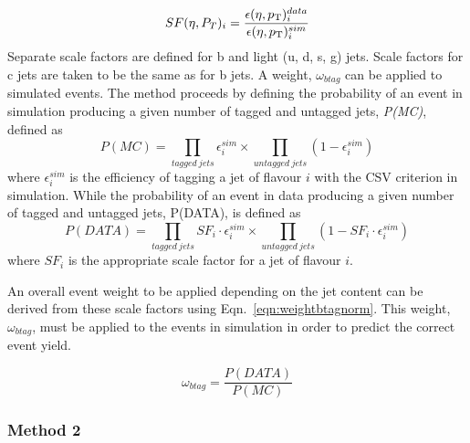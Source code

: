 \begin{equation}
SF(\eta, P_{T})_{i} = \frac{\epsilon(\eta , p_{\mathrm{T}})^{data}_{i}}{\epsilon(\eta , p_{\mathrm{T}})^{sim}_{i}}
\label{eqn:sfbtagnorm}
\end{equation}
Separate scale factors are defined for b and light (u, d, s, g) jets. Scale factors for c jets are taken to be the same as for b jets. A weight, $\omega_{btag}$ can be applied to simulated events. The method proceeds by defining the probability of an event in simulation producing a given number of tagged and untagged jets, \emph{P(MC)}, defined as%
\begin{equation*}
P(MC) = \prod_{tagged~jets}\epsilon^{sim}_{i} \times \prod_{untagged~jets}(1- \epsilon^{sim}_{i})
\end{equation*}
where $\epsilon^{sim}_{i}$ is the efficiency of tagging a jet of flavour $i$ with the CSV criterion in simulation. While the probability of an event in data producing a given number of tagged and untagged jets, P(DATA), is defined as
\begin{equation*}
P(DATA) = \prod_{tagged~jets}SF_{i}\cdot\epsilon^{sim}_{i} \times \prod_{untagged~jets}(1- SF_{i}\cdot\epsilon^{sim}_{i})
\end{equation*}
where $SF_{i}$ is the appropriate scale factor for a jet of flavour $i$. 

An overall event weight to be applied depending on the jet content can be derived from these scale factors using Eqn.~\ref{eqn:weightbtagnorm}. This weight, $\omega_{btag}$, must be applied to the events in simulation in order to predict the correct event yield.

\begin{centering}
\begin{equation}
 \omega_{btag} = \frac{P(DATA)}{P(MC)}
 \label{eqn:weightbtagnorm}
\end{equation}
\end{centering}

\subsubsection{Method 2 ~\label{subsec:method2btag}}

